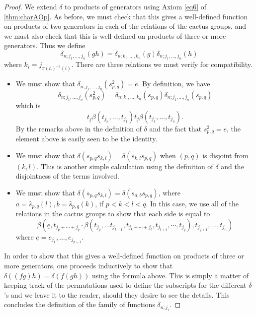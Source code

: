 \begin{proof}
We extend $\delta$ to products of generators using Axiom \ref{eq6} of \cref{thm:charAOp}. As before, we must check that this gives a well-defined function on products of two generators in each of the relations of the cactus groups, and we must also check that this is well-defined on products of three or more generators. Thus we define
  \[
    \delta_{n; j_1,\ldots,j_n}(gh) = \delta_{n; k_1,\ldots,k_n}(g)\delta_{n; j_1,\ldots,j_n}(h)
  \]
where $k_{i} = j_{\pi(h)^{-1}(i)}$. There are three relations we must verify for compatibility.
\begin{itemize}
\item We must show that $\delta_{n; j_1,\ldots,j_n}\left(s_{p,q}^{2}\right) = e$. By definition, we have
  \[
    \delta_{n; j_1,\ldots,j_n}\left(s_{p,q}^{2}\right) = \delta_{n; k_1,\ldots,k_n}\left(s_{p,q}\right)\delta_{n; j_1,\ldots,j_n}\left(s_{p,q}\right)
  \]
which is
  \[
    t_{\underline{j}}\beta(t_{j_{n}}, \ldots, t_{j_{1}}) t_{\underline{j}} \beta(t_{j_{1}}, \ldots, t_{j_{n}}).
  \]
By the remarks above in the definition of $\delta$ and the fact that $s_{p,q}^{2}=e$, the element above is easily seen to be the identity.
\item We must show that $\delta(s_{p,q}s_{k,l}) = \delta(s_{k,l}s_{p,q})$ when $(p,q)$ is disjoint from $(k,l)$. This is another simple calculation using the definition of $\delta$ and the disjointness of the terms involved.
\item We must show that $\delta(s_{p,q}s_{k,l}) = \delta(s_{a,b}s_{p,q})$,  where $a = \hat{s}_{p,q}(l), b = \hat{s}_{p,q}(k)$, if $p < k < l < q$. In this case, we use all of the relations in the cactus groups to show that each side is equal to
  \[
    \beta\left(\underline{e}, t_{j_{p}+\cdots + j_{q}} \cdot \beta \left(t_{j_{p}}, \ldots t_{j_{k-1}}, t_{j_{k}+ \cdots +j_{l}}, t_{j_{l+1}}, \cdots, t_{j_{q}}\right), t_{j_{q+1}}, \ldots, t_{j_{n}}\right)
  \]
where $\underline{e} = e_{j_{1}}, \ldots, e_{j_{p-1}}$.
\end{itemize}
In order to show that this gives a well-defined function on products of three or more generators, one proceeds inductively to show that $\delta\left((fg)h\right) = \delta\left(f(gh)\right)$ using the formula above. This is simply a matter of keeping track of the permutations used to define the subscripts for the different $\delta$'s and we leave it to the reader, should they desire to see the details. This concludes the definition of the family of functions $\delta_{n; j_{i}}$.


\end{proof}
